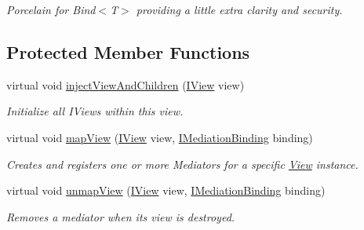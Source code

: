 \begin{DoxyCompactItemize}
\begin{DoxyCompactList}\small\item\em Porcelain for Bind$<$\-T$>$ providing a little extra clarity and security. \end{DoxyCompactList}\end{DoxyCompactItemize}
\subsection*{Protected Member Functions}
\begin{DoxyCompactItemize}
\item 
\hypertarget{classstrange_1_1extensions_1_1mediation_1_1impl_1_1_mediation_binder_a01f172fc7a3cd0a45a44568a65e62a4f}{virtual void \hyperlink{classstrange_1_1extensions_1_1mediation_1_1impl_1_1_mediation_binder_a01f172fc7a3cd0a45a44568a65e62a4f}{inject\-View\-And\-Children} (\hyperlink{interfacestrange_1_1extensions_1_1mediation_1_1api_1_1_i_view}{I\-View} view)}\label{classstrange_1_1extensions_1_1mediation_1_1impl_1_1_mediation_binder_a01f172fc7a3cd0a45a44568a65e62a4f}

\begin{DoxyCompactList}\small\item\em Initialize all I\-Views within this view. \end{DoxyCompactList}\item 
virtual void \hyperlink{classstrange_1_1extensions_1_1mediation_1_1impl_1_1_mediation_binder_a8f43c7f8bf7b41f12f7b453bcbfc5fcd}{map\-View} (\hyperlink{interfacestrange_1_1extensions_1_1mediation_1_1api_1_1_i_view}{I\-View} view, \hyperlink{interfacestrange_1_1extensions_1_1mediation_1_1api_1_1_i_mediation_binding}{I\-Mediation\-Binding} binding)
\begin{DoxyCompactList}\small\item\em Creates and registers one or more Mediators for a specific \hyperlink{classstrange_1_1extensions_1_1mediation_1_1impl_1_1_view}{View} instance. \end{DoxyCompactList}\item 
\hypertarget{classstrange_1_1extensions_1_1mediation_1_1impl_1_1_mediation_binder_ac920c35b85c82588c9d847e494159a18}{virtual void \hyperlink{classstrange_1_1extensions_1_1mediation_1_1impl_1_1_mediation_binder_ac920c35b85c82588c9d847e494159a18}{unmap\-View} (\hyperlink{interfacestrange_1_1extensions_1_1mediation_1_1api_1_1_i_view}{I\-View} view, \hyperlink{interfacestrange_1_1extensions_1_1mediation_1_1api_1_1_i_mediation_binding}{I\-Mediation\-Binding} binding)}\label{classstrange_1_1extensions_1_1mediation_1_1impl_1_1_mediation_binder_ac920c35b85c82588c9d847e494159a18}

\begin{DoxyCompactList}\small\item\em Removes a mediator when its view is destroyed. \end{DoxyCompactList}\end{DoxyCompactItemize}
